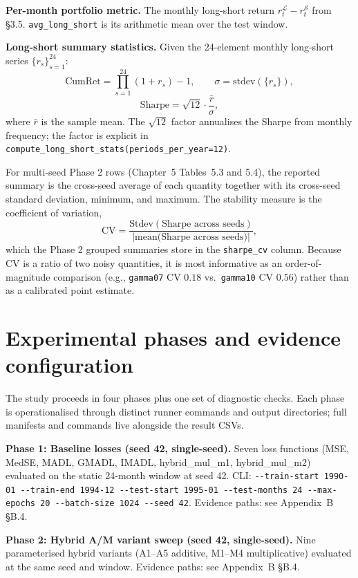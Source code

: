\textbf{Per-month portfolio metric.} The monthly long-short return $r^{\mathcal{L}}_t - r^{\mathcal{S}}_t$ from \S3.5. \texttt{avg\_long\_short} is its arithmetic mean over the test window.

\textbf{Long-short summary statistics.} Given the 24-element monthly long-short series $\{r_s\}_{s=1}^{24}$:
\[
\mathrm{CumRet} = \textstyle\prod_{s=1}^{24}(1 + r_s) - 1,
\qquad
\sigma = \mathrm{stdev}(\{r_s\}),
\]
\[
\mathrm{Sharpe} = \sqrt{12} \cdot \frac{\bar r}{\sigma},
\]
where $\bar r$ is the sample mean. The $\sqrt{12}$ factor annualises the Sharpe from monthly frequency; the factor is explicit in \texttt{compute\_long\_short\_stats(periods\_per\_year=12)}.

For multi-seed Phase 2 rows (Chapter~5 Tables~5.3 and 5.4), the reported summary is the cross-seed average of each quantity together with its cross-seed standard deviation, minimum, and maximum. The stability measure is the coefficient of variation,
\[
\mathrm{CV} = \frac{\mathrm{Stdev}(\text{Sharpe across seeds})}{|\text{mean(Sharpe across seeds)}|},
\]
which the Phase 2 grouped summaries store in the \texttt{sharpe\_cv} column. Because $\mathrm{CV}$ is a ratio of two noisy quantities, it is most informative as an order-of-magnitude comparison (e.g., \texttt{gamma07} CV $0.18$ vs.\ \texttt{gamma10} CV $0.56$) rather than as a calibrated point estimate.

\section{Experimental phases and evidence configuration}

\label{sec:experimental-phases}

The study proceeds in four phases plus one set of diagnostic checks. Each phase is operationalised through distinct runner commands and output directories; full manifests and commands live alongside the result CSVs.

\textbf{Phase 1: Baseline losses (seed 42, single-seed).} Seven loss functions (MSE, MedSE, MADL, GMADL, IMADL, hybrid\_mul\_m1, hybrid\_mul\_m2) evaluated on the static 24-month window at seed 42. CLI: \texttt{-{}-train-start 1990-01 -{}-train-end 1994-12 -{}-test-start 1995-01 -{}-test-months 24 -{}-max-epochs 20 -{}-batch-size 1024 -{}-seed 42}. Evidence paths: see Appendix~B \S B.4.

\textbf{Phase 2: Hybrid A/M variant sweep (seed 42, single-seed).} Nine parameterised hybrid variants (A1--A5 additive, M1--M4 multiplicative) evaluated at the same seed and window. Evidence paths: see Appendix~B \S B.4.

